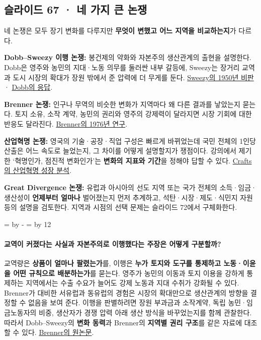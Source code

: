 \documentclass[10pt,a4paper]{article}
\newcommand{\ReserveQuestionSpace}{%
  \par\begingroup
  \dimen0=\pagegoal \advance\dimen0 by -\pagetotal
  \dimen2=\baselineskip \multiply\dimen2 by 12
  \ifdim\dimen0<\dimen2 \newpage\fi
  \endgroup}
\begin{document}
\subsection{슬라이드 67 · 네 가지 큰 논쟁}
네 논쟁은 모두 장기 변화를 다루지만 \textbf{무엇이 변했고 어느 지역을 비교하는지}가 다르다.\par

\noindent\textbullet \textbf{Dobb–Sweezy 이행 논쟁:} 봉건제의 약화와 자본주의 생산관계의 출현을 설명한다. Dobb은 영주와 농민의 지대·노동 의무를 둘러싼 내부 갈등에, Sweezy는 장거리 교역과 도시 시장의 확대가 장원 밖에서 준 압력에 더 무게를 둔다. \href{https://journals.sagepub.com/doi/10.1177/003682375001400204}{Sweezy의 1950년 비판} · \href{https://journals.sagepub.com/doi/10.1177/003682375001400205}{Dobb의 응답}.\par
\noindent\textbullet \textbf{Brenner 논쟁:} 인구나 무역의 비슷한 변화가 지역마다 왜 다른 결과를 낳았는지 묻는다. 토지 소유, 소작 계약, 농민의 권리와 영주의 강제력이 달라지면 시장 기회에 대한 반응도 달라진다. \href{https://doi.org/10.1093/past/70.1.30}{Brenner의 1976년 연구}.\par
\noindent\textbullet \textbf{산업혁명 논쟁:} 영국의 기술·공장·직업 구성은 빠르게 바뀌었는데 국민 전체의 1인당 산출은 어느 속도로 늘었는지, 그 차이를 어떻게 설명할지가 쟁점이다. 강의에서 제기한 ‘혁명인가, 점진적 변화인가’는 \textbf{변화의 지표와 기간}을 정해야 답할 수 있다. \href{https://www.bancaditalia.it/pubblicazioni/altri-atti-seminari/2005/CRAFTS\_22\_03\_2005.pdf}{Crafts의 산업혁명 성장 분석}.\par
\noindent\textbullet \textbf{Great Divergence 논쟁:} 유럽과 아시아의 선도 지역 또는 국가 전체의 소득·임금·생산성이 \textbf{언제부터 얼마나} 벌어졌는지 먼저 추계하고, 석탄·시장·제도·식민지 자원 등의 설명을 검토한다. 지역과 시점의 선택 문제는 슬라이드 72에서 구체화한다.\par

\ReserveQuestionSpace
\paragraph{교역이 커졌다는 사실과 자본주의로 이행했다는 주장은 어떻게 구분할까?}

교역량은 \textbf{상품이 얼마나 팔렸는가}를, 이행은 \textbf{누가 토지와 도구를 통제하고 노동·이윤을 어떤 규칙으로 배분하는가}를 묻는다. 영주가 농민의 이동과 토지 이용을 강하게 통제하는 지역에서는 수출 수요가 늘어도 강제 노동과 지대 수취가 강화될 수 있다. Brenner가 대비한 서유럽과 동유럽의 경험은 시장의 확대만으로 생산관계의 방향을 결정할 수 없음을 보여 준다. 이행을 판별하려면 장원 부과금과 소작계약, 독립 농민·임금노동자의 비중, 생산자가 경쟁 압력 아래 생산 방식을 바꾸었는지를 함께 관찰한다. 따라서 Dobb–Sweezy의 \textbf{변화 동력}과 Brenner의 \textbf{지역별 권리 구조}를 같은 자료에 대조할 수 있다. \href{https://doi.org/10.1093/past/70.1.30}{Brenner의 원논문}.\par
\end{document}
